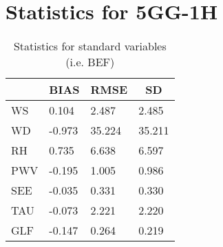 \documentclass[11pt,english]{article}
\begin{document}
\section{Statistics for 5GG-1H}
\newpage
\begin{table}[]
\begin{center}
\begin{tabular}{|l|l|l|l|}
\hline
                            & \multicolumn{1}{c|}{\cellcolor[HTML]{C0C0C0}\textbf{BIAS}} & \multicolumn{1}{c|}{\cellcolor[HTML]{C0C0C0}\textbf{RMSE}} & \multicolumn{1}{c|}{\cellcolor[HTML]{C0C0C0}\textbf{SD}} \\\hline
\cellcolor[HTML]{C0C0C0}WS  &     0.104                                &     2.487                                &     2.485                                \\
\cellcolor[HTML]{C0C0C0}WD  &    -0.973                                &    35.224                                &    35.211                                \\
\cellcolor[HTML]{C0C0C0}RH  &     0.735                                &     6.638                                &     6.597                                \\
\cellcolor[HTML]{C0C0C0}PWV &    -0.195                               &     1.005                               &     0.986                               \\
\cellcolor[HTML]{C0C0C0}SEE &    -0.035                               &     0.331                               &     0.330                               \\
\cellcolor[HTML]{C0C0C0}TAU &    -0.073                               &     2.221                               &     2.220                               \\
\cellcolor[HTML]{C0C0C0}GLF &    -0.147                               &     0.264                               &     0.219                               \\
\hline
\end{tabular}
\caption{Statistics for standard variables (i.e. BEF)}
\end{center}
\end{table}
\newpage
\end{document}
